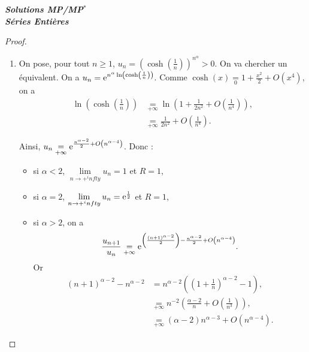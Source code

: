 \documentclass[12pt]{article}
\begin{document}
\begin{titlepage}
	\centering
	\vspace*{\fill}
	\Huge \textit{\textbf{Solutions MP/MP$^*$\\ Séries Entières}}
	\vspace*{\fill}
\end{titlepage}

\begin{proof}
    \phantom{}
    \begin{enumerate}
        \item On pose, pour tout $n\geqslant1$, $u_n=\left(\cosh\left(\frac{1}{n}\right)\right)^{n^{\alpha}}>0$. On va chercher un équivalent. On a $u_n=\mathrm{e}^{n^{\alpha}\ln\left(\cosh\left(\frac{1}{n}\right)\right)}$. Comme $\cosh(x)\underset{0}{=}1+\frac{x^{2}}{2}+O(x^{4})$, on a 
        \begin{align}
            \ln\left(\cosh\left(\frac{1}{n}\right)\right)
            &\underset{+\infty}{=}\ln\left(1+\frac{1}{2n^{2}}+O\left(\frac{1}{n^{4}}\right)\right),\\
            &\underset{+\infty}{=}\frac{1}{2n^{2}}+O\left(\frac{1}{n^{4}}\right).
        \end{align}

        Ainsi, $u_n\underset{+\infty}{=}\mathrm{e}^{\frac{n^{\alpha-2}}{2}+O\left(n^{\alpha-4}\right)}$. Donc :
        \begin{itemize}
            \item si $\alpha<2$, $\lim\limits_{n\to+^infty}u_n=1$ et $R=1$,
            \item si $\alpha=2$, $\lim\limits_{n\to+^infty}u_n=\mathrm{e}^{\frac{1}{2}}$ et $R=1$,
            \item si $\alpha>2$, on a 
            \begin{equation}
                \frac{u_{n+1}}{u_n}\underset{+\infty}{=}\mathrm{e}^{\left(\frac{(n+1)^{\alpha-2}}{2}\right)-\frac{n^{\alpha-2}}{2}+O\left(n^{\alpha-4}\right)}.
            \end{equation}
            Or
            \begin{align}
                \left(n+1\right)^{\alpha-2}-n^{\alpha-2}
                &= n^{\alpha-2}\left(\left(1+\frac{1}{n}\right)^{\alpha-2}-1\right),\\
                &\underset{+\infty}{=}n^{-2}\left(\frac{\alpha-2}{n}+O\left(\frac{1}{n^{3}}\right)\right),\\
                &\underset{+\infty}{=}\left(\alpha-2\right)n^{\alpha-3}+O\left(n^{\alpha-4}\right).
            \end{align}


\end{itemize}
\end{enumerate}
\end{proof}
\end{document}
